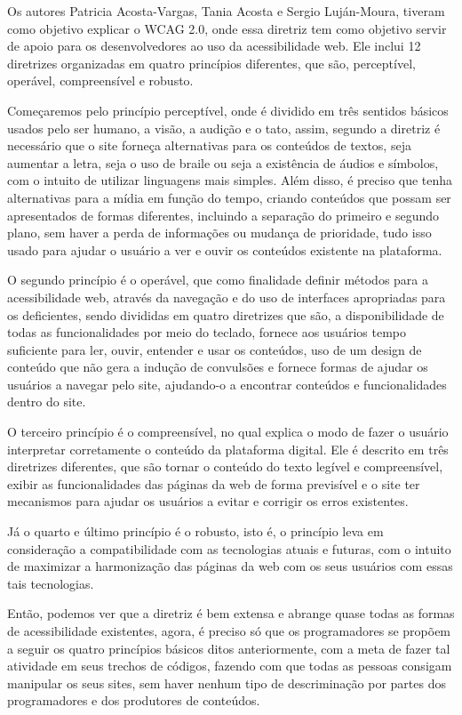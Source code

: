 \documentclass[a4paper]{article}
\begin{document}
\begin{titlepage}
Os autores Patricia Acosta-Vargas, Tania Acosta e Sergio Luján-Moura, tiveram como objetivo explicar o WCAG 2.0, onde essa diretriz tem como objetivo servir de apoio para os desenvolvedores ao uso da acessibilidade web. Ele inclui 12 diretrizes organizadas em quatro princípios diferentes, que são, perceptível, operável, compreensível e robusto. 

Começaremos pelo princípio perceptível, onde é dividido em três sentidos básicos usados pelo ser humano, a visão, a audição e o tato, assim, segundo a diretriz é necessário que o site forneça alternativas para os conteúdos de textos, seja aumentar a letra, seja o uso de braile ou seja a existência de áudios e símbolos, com o intuito de utilizar linguagens mais simples. Além disso, é preciso que tenha alternativas para a mídia em função do tempo, criando conteúdos que possam ser apresentados de formas diferentes, incluindo a separação do primeiro e segundo plano, sem haver a perda de informações ou mudança de prioridade, tudo isso usado para ajudar o usuário a ver e ouvir os conteúdos existente na plataforma.

O segundo princípio é o operável, que como finalidade definir métodos para a acessibilidade web, através da navegação e do uso de interfaces apropriadas para os deficientes, sendo divididas em quatro diretrizes que são, a disponibilidade de todas as funcionalidades por meio do teclado, fornece aos usuários tempo suficiente para ler, ouvir, entender e usar os conteúdos, uso de um design de conteúdo que não gera a indução de convulsões e fornece formas de ajudar os usuários a navegar pelo site, ajudando-o a encontrar conteúdos e funcionalidades dentro do site.

O terceiro princípio é o compreensível, no qual explica o modo de fazer o usuário interpretar corretamente o conteúdo da plataforma digital. Ele é descrito em três diretrizes diferentes, que são tornar o conteúdo do texto legível e compreensível, exibir as funcionalidades das páginas da web de forma previsível e o site ter mecanismos para ajudar os usuários a evitar e corrigir os erros existentes.

Já o quarto e último princípio é o robusto, isto é, o princípio leva em consideração a compatibilidade com as tecnologias atuais e futuras, com o intuito de maximizar a harmonização das páginas da web com os seus usuários com essas tais tecnologias.

Então, podemos ver que a diretriz é bem extensa e abrange quase todas as formas de acessibilidade existentes, agora, é preciso só que os programadores se propõem a seguir os quatro princípios básicos ditos anteriormente, com a meta de fazer tal atividade em seus trechos de códigos, fazendo com que todas as pessoas consigam manipular os seus sites, sem haver nenhum tipo de descriminação por partes dos programadores e dos produtores de conteúdos.


\end{titlepage}
\end{document}
